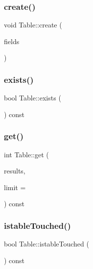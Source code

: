 \subsubsection{\texorpdfstring{create()}{create()}}
{\footnotesize\ttfamily void Table\+::create (\begin{DoxyParamCaption}\item[{const vector$<$ \mbox{\hyperlink{structSqlField}{Sql\+Field}} $>$ \&}]{fields }\end{DoxyParamCaption})}

\mbox{\label{classTable_a965f8ad5d716320501d64a121429ce50}} 
\subsubsection{\texorpdfstring{exists()}{exists()}}
{\footnotesize\ttfamily bool Table\+::exists (\begin{DoxyParamCaption}{ }\end{DoxyParamCaption}) const}

\mbox{\label{classTable_af1ce76323b4045b893deaf05f51abfd0}} 
\subsubsection{\texorpdfstring{get()}{get()}}
{\footnotesize\ttfamily int Table\+::get (\begin{DoxyParamCaption}\item[{\mbox{\hyperlink{db_8h_a356f4bbcc8528145c25584033ef0bcb8}{sql\+Result}} \&}]{results,  }\item[{int}]{limit = {} }\end{DoxyParamCaption}) const}

\mbox{\label{classTable_a46bf355769e7691ce79ff4363010dc7e}} 
\subsubsection{\texorpdfstring{istable\+Touched()}{istableTouched()}}
{\footnotesize\ttfamily bool Table\+::istable\+Touched (\begin{DoxyParamCaption}{ }\end{DoxyParamCaption}) const\hspace{0.3cm}{\ttfamily [inline]}}


